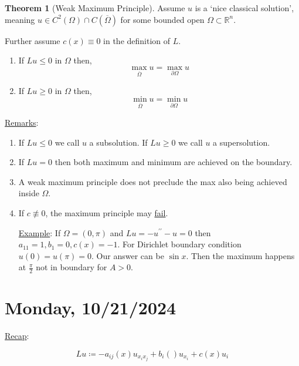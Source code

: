 \documentclass{article}
\theoremstyle{definition}
\newtheorem{theorem}{Theorem}
\begin{document}
\begin{theorem}
    [Weak Maximum Principle] Assume \(u\) is a `nice classical solution', meaning \(u\in C^2(\Omega)\cap C(\overline{\Omega})\) for some bounded open \(\Omega \subset \mathbb{R}^n\).
    
    Further assume \(c(x)\equiv 0\) in the definition of \(L\).

    \begin{enumerate}[label=\roman*)]
        \item If \(Lu \leq 0\) in \(\Omega\) then,
        \[
            \max_{\overline{\Omega}} u = \max_{\partial \Omega} u
        \]
        \item If \(Lu \geq 0\) in \(\Omega\) then,
        \[
            \min_{\overline{\Omega}} u = \min_{\partial \Omega} u
        \]
    \end{enumerate} 
\end{theorem}

\underline{Remarks}:

\begin{enumerate}[label=\arabic*)]
    \item  If \(L u \leq 0\) we call \(u\) a subsolution. If \(Lu \geq 0\) we call \(u\) a supersolution.

    \item If \(Lu = 0\) then both maximum and minimum are achieved on the boundary.

    \item A weak maximum principle does not preclude the max also being achieved inside \(\Omega\).
    
    \item If \(c\not\equiv 0\), the maximum principle may \underline{fail}.
    
    \underline{Example}: If \(\Omega = (0,\pi)\) and \(Lu = -u^{\prime\prime} - u = 0\) then \(a_{11} = 1, b_1 = 0, c(x)=-1\). For Dirichlet boundary condition \(u(0)=u(\pi)=0\). Our answer can be \(\sin x\). Then the maximum happens at \(\frac{\pi}{2}\) not in boundary for \(A > 0\). 

\end{enumerate}

\section*{Monday, 10/21/2024}

\underline{Recap}:

\[
    Lu \coloneqq -a_{ij} (x) u_{x_i x_j} + b_{i} () u_{x_i} + c(x) u_{i}  
\]
\end{document}
